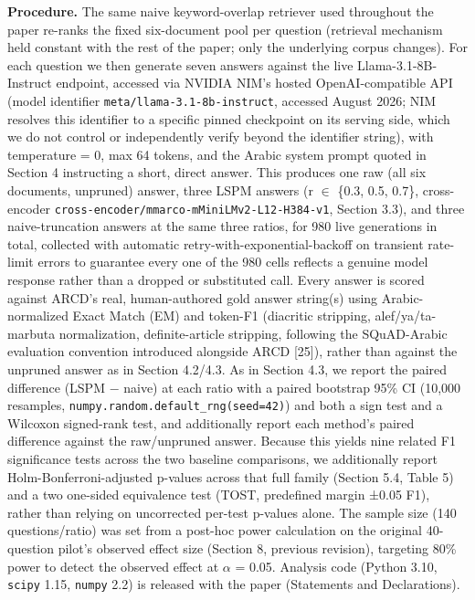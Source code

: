 \textbf{Procedure.} The same naive keyword-overlap retriever used throughout the paper re-ranks the fixed six-document pool per question (retrieval mechanism held constant with the rest of the paper; only the underlying corpus changes). For each question we then generate seven answers against the live Llama-3.1-8B-Instruct endpoint, accessed via NVIDIA NIM's hosted OpenAI-compatible API (model identifier \texttt{meta/llama-3.1-8b-instruct}, accessed August 2026; NIM resolves this identifier to a specific pinned checkpoint on its serving side, which we do not control or independently verify beyond the identifier string), with temperature = 0, max 64 tokens, and the Arabic system prompt quoted in Section 4 instructing a short, direct answer. This produces one raw (all six documents, unpruned) answer, three LSPM answers (r $\in$ \{0.3, 0.5, 0.7\}, cross-encoder \texttt{cross-encoder/mmarco-mMiniLMv2-L12-H384-v1}, Section 3.3), and three naive-truncation answers at the same three ratios, for 980 live generations in total, collected with automatic retry-with-exponential-backoff on transient rate-limit errors to guarantee every one of the 980 cells reflects a genuine model response rather than a dropped or substituted call. Every answer is scored against ARCD's real, human-authored gold answer string(s) using Arabic-normalized Exact Match (EM) and token-F1 (diacritic stripping, alef/ya/ta-marbuta normalization, definite-article stripping, following the SQuAD-Arabic evaluation convention introduced alongside ARCD [25]), rather than against the unpruned answer as in Section 4.2/4.3. As in Section 4.3, we report the paired difference (LSPM $-$ naive) at each ratio with a paired bootstrap 95\% CI (10,000 resamples, \texttt{numpy.random.default\_rng(seed=42)}) and both a sign test and a Wilcoxon signed-rank test, and additionally report each method's paired difference against the raw/unpruned answer. Because this yields nine related F1 significance tests across the two baseline comparisons, we additionally report Holm-Bonferroni-adjusted p-values across that full family (Section 5.4, Table 5) and a two one-sided equivalence test (TOST, predefined margin ±0.05 F1), rather than relying on uncorrected per-test p-values alone. The sample size (140 questions/ratio) was set from a post-hoc power calculation on the original 40-question pilot's observed effect size (Section 8, previous revision), targeting 80\% power to detect the observed effect at $\alpha$ = 0.05. Analysis code (Python 3.10, \texttt{scipy} 1.15, \texttt{numpy} 2.2) is released with the paper (Statements and Declarations).

